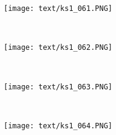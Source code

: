 \documentclass[landscape,a3paper]{ltjsarticle}
\begin{document}
\begin{multicols*}{4}


  \begin{minipage}{0.9\columnwidth}
   \texttt{[image: text/ks1\_061.PNG]}
  \end{minipage}
 \columnbreak\\
  \begin{minipage}{0.9\columnwidth}
   \texttt{[image: text/ks1\_062.PNG]}
  \end{minipage}
 \columnbreak\\
  \begin{minipage}{0.9\columnwidth}
   \texttt{[image: text/ks1\_063.PNG]}
  \end{minipage}
 \columnbreak\\
  \begin{minipage}{0.9\columnwidth}
   \texttt{[image: text/ks1\_064.PNG]}
  \end{minipage}
 
\end{multicols*}
\end{document}
